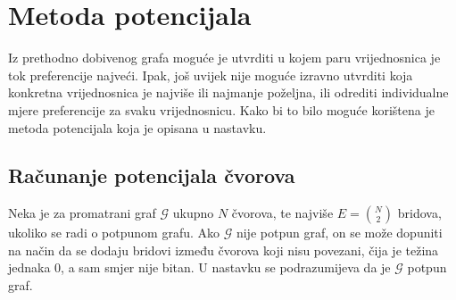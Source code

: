 \documentclass[lmodern, utf8, diplomski, numeric]{fer}
\newcommand{\graph}[1]{\mathcal{#1}}
\begin{document}
  

  \section{Metoda potencijala}
  \label{sec:metpot}
  Iz prethodno dobivenog grafa moguće je utvrditi u kojem paru vrijednosnica je tok preferencije najveći.
  Ipak, još uvijek nije moguće izravno utvrditi koja konkretna vrijednosnica je najviše ili najmanje poželjna, ili odrediti individualne mjere preferencije za svaku vrijednosnicu.
  Kako bi to bilo moguće korištena je metoda potencijala koja je opisana u nastavku.
  
  
  \subsection{Računanje potencijala čvorova}

  Neka je za promatrani graf $\graph{G}$ ukupno $N$ čvorova, te najviše $E = \binom{N}{2}$ bridova, ukoliko se radi o potpunom grafu.
  Ako $\graph{G}$ nije potpun graf, on se može dopuniti na način da se dodaju bridovi između čvorova koji nisu povezani, čija je težina jednaka 0, a sam smjer nije bitan.
  U nastavku se podrazumijeva da je $\graph{G}$ potpun graf.
  
\end{document}
